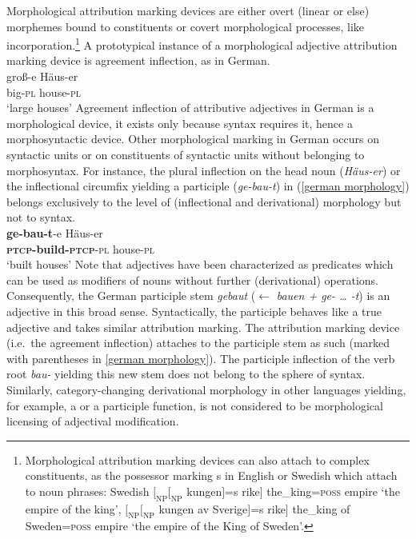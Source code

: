 Morphological attribution marking devices are either overt (linear or else) morphemes bound to constituents or covert morphological processes, like incorporation.\footnote{Morphological attribution marking devices can also attach to complex constituents, as the possessor marking s in English or Swedish which attach to noun phrases: Swedish $[_\textrm{NP} [_\textrm{NP}$ kungen$]$=s rike$]$ the\_king=\textsc{poss} empire ‘the empire of the king’, $[_\textrm{NP} [_\textrm{NP}$ kungen av Sverige$]$=s rike$]$ the\_king of Sweden=\textsc{poss} empire ‘the empire of the King of Sweden’.} A prototypical instance of a morphological adjective attribution marking device is agreement inflection, as in German.
\ea
{}\\
\gll	groß-e Häus-er\\
	big-\textsc{pl} house-\textsc{pl}\\
\glt	‘large houses’
\z
Agreement inflection of attributive adjectives in German is a morphological device, it exists only because syntax requires it,  hence a morphosyntactic device. Other morphological marking in German occurs on syntactic units or on constituents of syntactic units without belonging to morphosyntax. For instance, the plural inflection on the head noun (\textit{Häus-er}) or the inflectional circumfix yielding a participle (\textit{ge-bau-t}) in (\ref{german morphology}) belongs exclusively to the level of (inflectional and derivational) morphology but not to syntax.
\ea\label{german morphology}
\\
\gll	\textbf{ge-bau-t}-e Häus-er\\
	\textbf{\textsc{ptcp}-build-\textsc{ptcp}}-\textsc{pl} house-\textsc{pl}\\
\glt	‘built houses’
\z
Note that adjectives have been characterized as predicates which can be used as modifiers of nouns without further (derivational) operations. Consequently, the German participle stem \textit{gebaut} ($\leftarrow$ \textit{bauen + ge- … -t}) is an adjective in this broad sense. Syntactically, the participle behaves like a true adjective and takes similar attribution marking. The attribution marking device (i.e.~the agreement inflection) attaches to the participle stem as such (marked with parentheses in \ref{german morphology}). The participle inflection of the verb root \textit{bau-} yielding this new stem does not belong to the sphere of syntax. Similarly, category-changing derivational morphology in other languages yielding, for example, a  or a participle function, is not considered to be morphological licensing of adjectival modification.

